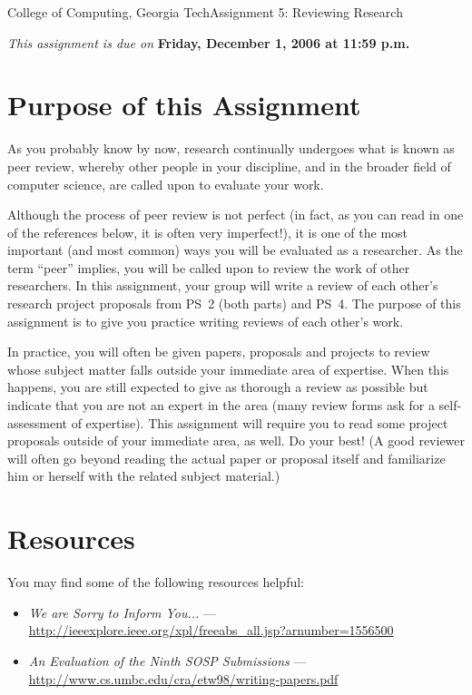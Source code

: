 \documentclass[11pt]{article}
\begin{document}


{College of Computing, Georgia Tech}{Assignment 5: Reviewing Research}

{\em This assignment is due on} {\bf Friday, December 1, 2006 at 11:59 p.m.}  


\section{Purpose of this Assignment}

As you probably know by now, research continually undergoes what is
known as peer review, whereby other people in your discipline, and in
the broader field of computer science, are called upon to evaluate your
work.  

Although the process of peer review is not perfect (in fact, as you can
read in one of the references below, it is often very imperfect!), it is
one of the most important (and most common) ways you will be evaluated
as a researcher.  As the term ``peer'' implies, you will be called upon
to review the work of other researchers.  In this assignment, your group
will write a review of each other's research project proposals from PS~2
(both parts) and PS~4.  The purpose of this assignment is to give you
practice writing reviews of each other's work.  

In practice, you will often be given papers, proposals and projects to
review whose subject matter falls outside your immediate area of
expertise.  When this happens, you are still expected to give as
thorough a review as possible but indicate that you are not an expert in
the area (many review forms ask for a self-assessment of expertise).
This assignment will require you to read some project proposals outside
of your immediate area, as well.  Do your best!  (A good reviewer will
often go beyond reading the actual paper or proposal itself and
familiarize him or herself with the related subject material.)

\section{Resources}

You may find some of the following resources helpful:

\begin{itemize}
\itemsep=-1pt
\item {\em We are Sorry to Inform You...} --- \\
  \url{http://ieeexplore.ieee.org/xpl/freeabs_all.jsp?arnumber=1556500}
\item {\em An Evaluation of the Ninth SOSP Submissions} --- \\
  \url{http://www.cs.umbc.edu/cra/etw98/writing-papers.pdf}
\end{itemize}
\end{document}
